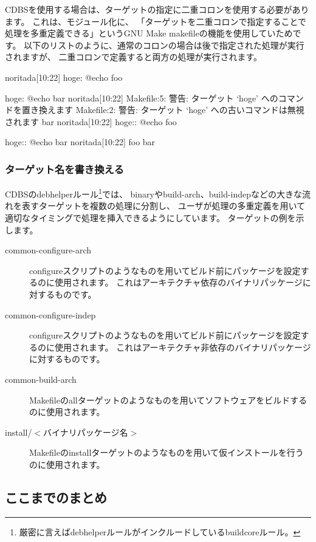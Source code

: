 \documentclass[mingoth,a4paper]{jsarticle}
\begin{document}
CDBSを使用する場合は、ターゲットの指定に二重コロンを使用する必要があります。
これは、モジュール化に、
「ターゲットを二重コロンで指定することで処理を多重定義できる」というGNU Make makefileの機能を使用していためです。
以下のリストのように、通常のコロンの場合は後で指定された処理が実行されますが、
二重コロンで定義すると両方の処理が実行されます。

\begin{commandline}
noritada[10:22]%
hoge:
        @echo foo

hoge:
	@echo bar
noritada[10:22]%
Makefile:5: 警告: ターゲット `hoge' へのコマンドを置き換えます
Makefile:2: 警告: ターゲット `hoge' への古いコマンドは無視されます
bar
noritada[10:22]%
hoge::
	@echo foo

hoge::
	@echo bar
noritada[10:22]%
foo
bar
\end{commandline}

\subsubsection{ターゲット名を書き換える}

CDBSのdebhelperルール\footnote{厳密に言えばdebhelperルールがインクルードしているbuildcoreルール。}では、
binaryやbuild-arch、build-indepなどの大きな流れを表すターゲットを複数の処理に分割し、
ユーザが処理の多重定義を用いて適切なタイミングで処理を挿入できるようにしています。
ターゲットの例を示します。

\begin{description}
 \item[common-configure-arch]
    configureスクリプトのようなものを用いてビルド前にパッケージを設定するのに使用されます。
    これはアーキテクチャ依存のバイナリパッケージに対するものです。
 \item[common-configure-indep]
    configureスクリプトのようなものを用いてビルド前にパッケージを設定するのに使用されます。
    これはアーキテクチャ非依存のバイナリパッケージに対するものです。
 \item[common-build-arch]
    Makefileのallターゲットのようなものを用いてソフトウェアをビルドするのに使用されます。
 \item[install/$<$バイナリパッケージ名$>$]
    Makefileのinstallターゲットのようなものを用いて仮インストールを行うのに使用されます。
\end{description}

\subsection{ここまでのまとめ}
\end{document}
